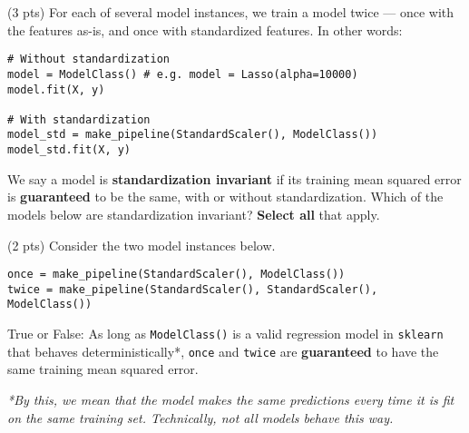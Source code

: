 \documentclass[twoside,12pt]{article}
\begin{document}
\begin{probset}
\begin{prob}[(5 pts)]
\begin{subprobset}
\begin{subprob}(3 pts) For each of several model instances, we train a model twice --- once with the features as-is, and once with standardized features. In other words:

\begin{verbatim}
# Without standardization
model = ModelClass() # e.g. model = Lasso(alpha=10000)
model.fit(X, y)

# With standardization
model_std = make_pipeline(StandardScaler(), ModelClass())
model_std.fit(X, y)
\end{verbatim}

We say a model is \textbf{standardization invariant} if its training mean squared error is \textbf{guaranteed} to be the same, with or without standardization. Which of the models below are standardization invariant? \textbf{Select all} that apply.








\end{subprob}

\vspace{0.2in}

\begin{subprob}(2 pts) Consider the two model instances below.

\begin{verbatim}
once = make_pipeline(StandardScaler(), ModelClass())
twice = make_pipeline(StandardScaler(), StandardScaler(), ModelClass())
\end{verbatim}

True or False: As long as \texttt{ModelClass()} is a valid regression model in \texttt{sklearn} that behaves deterministically*, \texttt{once} and \texttt{twice} are \textbf{guaranteed} to have the same training mean squared error.



\textit{\small{*By this, we mean that the model makes the same predictions every time it is fit on the same training set. Technically, not all models behave this way.}}



\end{subprob}
\end{subprobset}
\end{prob}
\end{probset}
\end{document}
